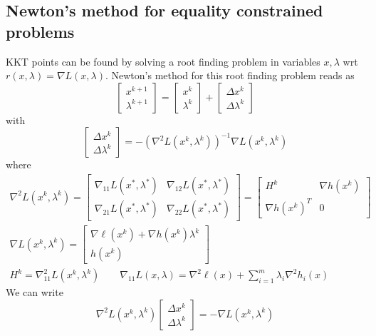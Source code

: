 \documentclass{book}
\theoremstyle{definition}
\theoremstyle{remark}
\theoremstyle{remark}
\begin{document}
\subsection{Newton's method for equality constrained problems}
KKT points can be found by solving a root finding problem in variables $x,\lambda$ wrt $r(x,\lambda)=\nabla L(x,\lambda)$. Newton's method for this root finding problem reads as 
\[
    \begin{bmatrix}
        x^{k+1} \\ \lambda^{k+1}
        \end{bmatrix} = \begin{bmatrix}
        x^k \\ \lambda^k
        \end{bmatrix} + \begin{bmatrix}
        \Delta x^k \\ \Delta \lambda^k
    \end{bmatrix}
\]
with 
\[
    \begin{bmatrix}
        \Delta x^k \\ \Delta \lambda^k
    \end{bmatrix} = -(\nabla^2 L(x^k,\lambda^k))^{-1}\nabla L(x^k,\lambda^k)
\]
where 
\begin{gather*}
    \nabla^2L(x^k,\lambda^k)= \begin{bmatrix}
        \nabla_{11} L(x^*,\lambda^*) & \nabla_{12} L(x^*,\lambda^*)\\
        \nabla_{21} L(x^*,\lambda^*) & \nabla_{22} L(x^*,\lambda^*)
        \end{bmatrix} = \begin{bmatrix}
        H^k & \nabla h(x^k) \\
        \nabla h(x^k)^T & 0
        \end{bmatrix} \\ \nabla L(x^k,\lambda^k) = \begin{bmatrix}
        \nabla \ell(x^k)+\nabla h(x^k)\lambda^k \\ h(x^k)
    \end{bmatrix} \\
    H^k = \nabla_{11}^2 L(x^k,\lambda^k) \qquad
    \nabla_{11}L(x,\lambda) = \nabla^2 \ell(x) + \displaystyle\sum_{i=1}^{m}\lambda_i\nabla^2h_i(x)
\end{gather*}
We can write 
\[
    \nabla^2L(x^k,\lambda^k)\begin{bmatrix}
        \Delta x^k \\ \Delta \lambda^k
    \end{bmatrix} = -\nabla L(x^k,\lambda^k)
\]
\end{document}
